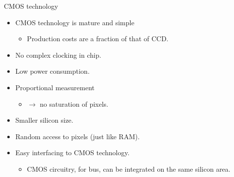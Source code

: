 \documentclass[compress]{beamer}
\begin{document}
\begin{frame}{CMOS technology}
{        \begin{itemize}
            \item CMOS technology is mature and simple
                \begin{itemize}
                    \item Production costs are a fraction of that of CCD.
                \end{itemize}
            \item No complex clocking in chip.
            \item Low power consumption.
            \item Proportional measurement
                \begin{itemize}
                    \item $\rightarrow$ no saturation of pixels.
                \end{itemize}
            \item Smaller silicon size.
            \item Random access to pixels (just like RAM).
            \item Easy interfacing to CMOS technology.
                \begin{itemize}
                    \item CMOS circuitry, \eg for bus, can be integrated on the same silicon
                        area.
                \end{itemize}
        \end{itemize}
    }

\end{frame}
\end{document}
